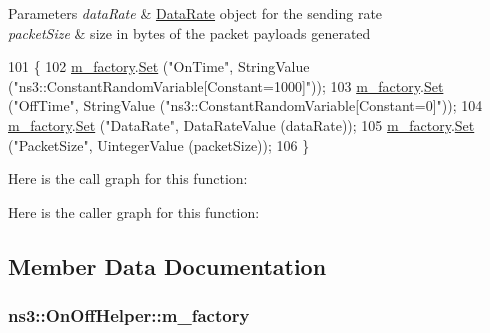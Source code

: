 \begin{DoxyParams}{Parameters}
{\em data\+Rate} & \hyperlink{classns3_1_1DataRate}{Data\+Rate} object for the sending rate \\
\hline
{\em packet\+Size} & size in bytes of the packet payloads generated \\
\hline
\end{DoxyParams}

\begin{DoxyCode}
101 \{
102   \hyperlink{classns3_1_1OnOffHelper_a7c59fb96ce97a56cfd974cfd5c24a85c}{m\_factory}.\hyperlink{classns3_1_1ObjectFactory_aef5c0d5019c96bdf01cefd1ff83f4a68}{Set} (\textcolor{stringliteral}{"OnTime"}, StringValue (\textcolor{stringliteral}{"ns3::ConstantRandomVariable[Constant=1000]"}));
103   \hyperlink{classns3_1_1OnOffHelper_a7c59fb96ce97a56cfd974cfd5c24a85c}{m\_factory}.\hyperlink{classns3_1_1ObjectFactory_aef5c0d5019c96bdf01cefd1ff83f4a68}{Set} (\textcolor{stringliteral}{"OffTime"}, StringValue (\textcolor{stringliteral}{"ns3::ConstantRandomVariable[Constant=0]"}));
104   \hyperlink{classns3_1_1OnOffHelper_a7c59fb96ce97a56cfd974cfd5c24a85c}{m\_factory}.\hyperlink{classns3_1_1ObjectFactory_aef5c0d5019c96bdf01cefd1ff83f4a68}{Set} (\textcolor{stringliteral}{"DataRate"}, DataRateValue (dataRate));
105   \hyperlink{classns3_1_1OnOffHelper_a7c59fb96ce97a56cfd974cfd5c24a85c}{m\_factory}.\hyperlink{classns3_1_1ObjectFactory_aef5c0d5019c96bdf01cefd1ff83f4a68}{Set} (\textcolor{stringliteral}{"PacketSize"}, UintegerValue (packetSize));
106 \}
\end{DoxyCode}


Here is the call graph for this function\+:




Here is the caller graph for this function\+:




\subsection{Member Data Documentation}
\subsubsection[{\texorpdfstring{m\+\_\+factory}{m_factory}}]{ ns3\+::\+On\+Off\+Helper\+::m\+\_\+factory\hspace{0.3cm}{\ttfamily [private]}}\hypertarget{classns3_1_1OnOffHelper_a7c59fb96ce97a56cfd974cfd5c24a85c}{}\label{classns3_1_1OnOffHelper_a7c59fb96ce97a56cfd974cfd5c24a85c}


